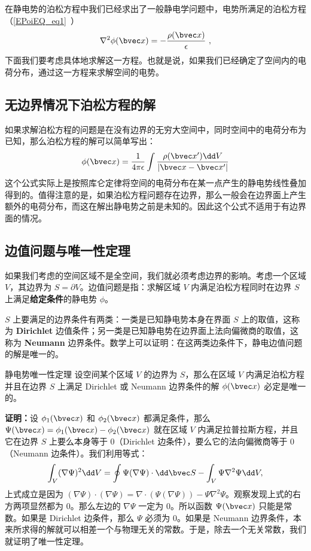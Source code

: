 

在静电势的泊松方程中我们已经求出了一般静电学问题中，电势所满足的泊松方程（\autoref{EPoiEQ_eq1}~）
\begin{align}
\nabla^2 \phi(\bvec x)=-\frac{\rho(\bvec x)}{\epsilon}~,
\end{align}
下面我们要考虑具体地求解这一方程。也就是说，如果我们已经确定了空间内的电荷分布，通过这一方程来求解空间的电势。
\subsection{无边界情况下泊松方程的解}
如果求解泊松方程的问题是在没有边界的无穷大空间中，同时空间中的电荷分布为已知，那么泊松方程的解可以简单写出：
\begin{align}
\phi(\bvec x)=\frac{1}{4\pi \epsilon}\int \frac{\rho (\bvec x')\dd V}{|\bvec x-\bvec x'|}
\end{align}
这个公式实际上是按照库仑定律将空间的电荷分布在某一点产生的静电势线性叠加得到的。值得注意的是，如果泊松方程问题存在边界，那么一般会在边界面上产生额外的电荷分布，而这在解出静电势之前是未知的。因此这个公式不适用于有边界面的情况。
\subsection{边值问题与唯一性定理}
如果我们考虑的空间区域不是全空间，我们就必须考虑边界的影响。考虑一个区域 $V$，其边界为 $S=\partial V$。边值问题是指：求解区域 $V$ 内满足泊松方程同时在边界 $S$ 上满足\textbf{给定条件}的静电势 $\phi$。

$S$ 上要满足的边界条件有两类：一类是已知静电势本身在界面 $S$
上的取值，这称为 \textbf{Dirichlet} 边值条件；另一类是已知静电势在边界面上法向偏微商的取值，这称为 \textbf{Neumann} 边界条件。数学上可以证明：在这两类边条件下，静电边值问题的解是唯一的。
\begin{theorem}{静电势唯一性定理}\label{empoi_the1}
设空间某个区域 $V$ 的边界为 $S$，那么在区域 $V$ 内满足泊松方程并且在边界 $S$ 上满足 Dirichlet 或 Neumann 边界条件的解 $\phi(\bvec x)$ 必定是唯一的。
\end{theorem}
\textbf{证明：}设 $\phi_1(\bvec x)$ 和 $\phi_2(\bvec x)$ 都满足条件，那么 $\Psi(\bvec x)=\phi_1(\bvec x)-\phi_2(\bvec x)$ 就在区域 $V$ 内满足拉普拉斯方程，并且它在边界 $S$ 上要么本身等于 $0$（Dirichlet 边条件），要么它的法向偏微商等于 $0$（Neumann 边条件）。我们利用等式：
\begin{align}
\int_V (\nabla \Psi)^2 \dd V=\oint \Psi(\nabla \Psi)\cdot \dd \bvec S - \int_V \Psi \nabla^2\Psi \dd V,
\end{align}
上式成立是因为 $(\nabla \Psi)\cdot (\nabla \Psi)=\nabla\cdot (\Psi(\nabla\Psi))-\Psi\nabla^2\Psi$。观察发现上式的右方两项显然都为 $0$。那么左边的 $\nabla\Psi$ 一定为 $0$。所以函数 $\Psi(\bvec x)$ 只能是常数。如果是 Dirichlet 边条件，那么 $\Psi$ 必须为 $0$。如果是 Neumann 边界条件，本来所求得的解就可以相差一个与物理无关的常数。于是，除去一个无关常数，我们就证明了唯一性定理。

